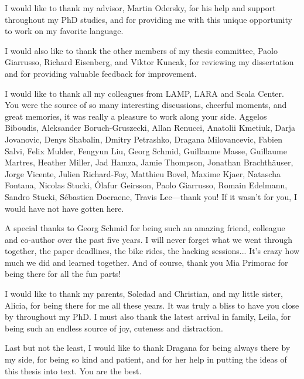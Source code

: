 I would like to thank my advisor, Martin Odersky, for his help and support throughout my PhD studies, and for providing me with this unique opportunity to work on my favorite language.

\begin{diff}
I would also like to thank the other members of my thesis committee, Paolo Giarrusso, Richard Eisenberg, and Viktor Kuncak, for reviewing my dissertation and for providing valuable feedback for improvement.
\end{diff}

I would like to thank all my colleagues from LAMP, LARA and Scala Center.
You were the source of so many interesting discussions, cheerful moments, and great memories, it was really a pleasure to work along your side.
Aggelos Biboudis,
Aleksander Boruch-Gruszecki,
Allan Renucci,
Anatolii Kmetiuk,
Darja Jovanovic,
Denys Shabalin,
Dmitry Petrashko,
Dragana Milovancevic,
Fabien Salvi,
Felix Mulder,
Fengyun Liu,
Georg Schmid,
Guillaume Masse,
Guillaume Martres,
Heather Miller,
Jad Hamza,
Jamie Thompson,
Jonathan Brachthäuser,
Jorge Vicente,
Julien Richard-Foy,
Matthieu Bovel,
Maxime Kjaer,
Natascha Fontana,
Nicolas Stucki,
Ólafur Geirsson,
Paolo Giarrusso,
Romain Edelmann,
Sandro Stucki,
Sébastien Doeraene,
Travis Lee---thank you!
If it wasn't for you, I would have not have gotten here.

A special thanks to Georg Schmid for being such an amazing friend, colleague and co-author over the past five years.
I will never forget what we went through together, the paper deadlines, the bike rides, the hacking sessions...
It's crazy how much we did and learned together.
And of course, thank you Mia Primorac for being there for all the fun parts!

I would like to thank my parents, Soledad and Christian, and my little sister, Alicia, for being there for me all these years.
It was truly a bliss to have you close by throughout my PhD.
I must also thank the latest arrival in family, Leila, for being such an endless source of joy, cuteness and distraction.

Last but not the least, I would like to thank Dragana for being always there by my side, for being so kind and patient, and for her help in putting the ideas of this thesis into text.
You are the best.
